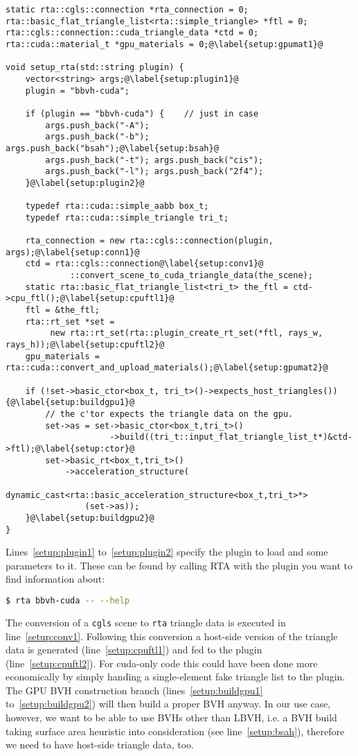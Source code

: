 \documentclass[a4paper,11pt]{scrartcl}
\begin{document}
\begin{lstlisting}
static rta::cgls::connection *rta_connection = 0;
rta::basic_flat_triangle_list<rta::simple_triangle> *ftl = 0;
rta::cgls::connection::cuda_triangle_data *ctd = 0;
rta::cuda::material_t *gpu_materials = 0;@\label{setup:gpumat1}@

void setup_rta(std::string plugin) {
	vector<string> args;@\label{setup:plugin1}@
	plugin = "bbvh-cuda";

	if (plugin == "bbvh-cuda") {	// just in case
		args.push_back("-A");
		args.push_back("-b"); args.push_back("bsah");@\label{setup:bsah}@
		args.push_back("-t"); args.push_back("cis");
		args.push_back("-l"); args.push_back("2f4");
	}@\label{setup:plugin2}@

	typedef rta::cuda::simple_aabb box_t;
	typedef rta::cuda::simple_triangle tri_t;

	rta_connection = new rta::cgls::connection(plugin, args);@\label{setup:conn1}@
	ctd = rta::cgls::connection@\label{setup:conv1}@
	         ::convert_scene_to_cuda_triangle_data(the_scene);
	static rta::basic_flat_triangle_list<tri_t> the_ftl = ctd->cpu_ftl();@\label{setup:cpuftl1}@
	ftl = &the_ftl;
	rta::rt_set *set = 
		 new rta::rt_set(rta::plugin_create_rt_set(*ftl, rays_w, rays_h));@\label{setup:cpuftl2}@
	gpu_materials = rta::cuda::convert_and_upload_materials();@\label{setup:gpumat2}@

	if (!set->basic_ctor<box_t, tri_t>()->expects_host_triangles()) {@\label{setup:buildgpu1}@
		// the c'tor expects the triangle data on the gpu.
		set->as = set->basic_ctor<box_t,tri_t>()
		             ->build((tri_t::input_flat_triangle_list_t*)&ctd->ftl);@\label{setup:ctor}@
		set->basic_rt<box_t,tri_t>()
		    ->acceleration_structure(
				dynamic_cast<rta::basic_acceleration_structure<box_t,tri_t>*>
				(set->as));
	}@\label{setup:buildgpu2}@
}
\end{lstlisting}

Lines~\ref{setup:plugin1} to~\ref{setup:plugin2} specify the plugin to load and some parameters to it.
These can be found by calling RTA with the plugin you want to find information about:
\begin{lstlisting}[language=bash]
$ rta bbvh-cuda -- --help
\end{lstlisting}
The conversion of a \lstinline|cgls| scene to \lstinline|rta| triangle data is executed in line~\ref{setup:conv1}.
Following this conversion a host-side version of the triangle data is generated (line~\ref{setup:cpuftl1}) 
	and fed to the plugin (line~\ref{setup:cpuftl2}).
For cuda-only code this could have been done more economically by simply handing a single-element fake triangle list to the plugin.
The GPU BVH construction branch (lines~\ref{setup:buildgpu1} to~\ref{setup:buildgpu2}) will then build a proper BVH anyway.
In our use case, however, we want to be able to use BVHs other than LBVH, 
	i.e. a BVH build taking surface area heuristic into consideration (see line~\ref{setup:bsah}), 
	therefore we need to have host-side triangle data, too.
\end{document}
